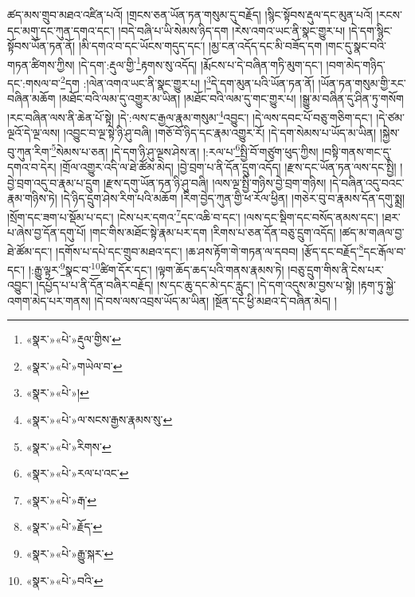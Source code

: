 ཚད་མས་གྲུབ་མཐའ་འཛིན་པའོ། །གྲངས་ཅན་ཡོན་ཏན་གསུམ་དུ་བརྗོད། །སྙིང་སྟོབས་རྡུལ་དང་མུན་པའོ། །རངས་དང་མགུ་དང་ཀུན་དགའ་དང་། །བདེ་བཞི་པ་ཡི་སེམས་ཉིད་དག །རེས་འགའ་ཡང་ནི་སྣང་གྱུར་པ། །དེ་དག་སྙིང་སྟོབས་ཡོན་ཏན་ནོ། །མི་དགའ་བ་དང་ཡོངས་གདུད་དང་། །མྱ་ངན་འདོད་དང་མི་བཟོད་དག །གང་དུ་སྣང་བའི་གཏན་ཚིགས་ཀྱིས། །དེ་དག་:རྡུལ་གྱི་\footnote{«སྣར་»«པེ་»རྡུལ་གྱིས་}རྟགས་སུ་འདོད། །རྨོངས་པ་དེ་བཞིན་གཏི་མུག་དང་། །བག་མེད་གཉིད་དང་:གསལ་བ་\footnote{«སྣར་»«པེ་»གཡེལ་བ་}དག :།ལེན་འགའ་ཡང་ནི་སྣང་གྱུར་པ། །\footnote{«སྣར་»«པེ་»།}དེ་དག་མུན་པའི་ཡོན་ཏན་ནོ། །ཡོན་ཏན་གསུམ་གྱི་རང་བཞིན་མཆོག །མཐོང་བའི་ལམ་དུ་འགྱུར་མ་ཡིན། །མཐོང་བའི་ལམ་དུ་གང་གྱུར་པ། །སྒྱུ་མ་བཞིན་དུ་ཤིན་ཏུ་གསོག །རང་བཞིན་ལས་ནི་ཆེན་པོ་སྟེ། །དེ་:ལས་ང་རྒྱལ་རྣམ་གསུམ་\footnote{«སྣར་»«པེ་»ལ་སངས་རྒྱས་རྣམས་སུ་}འབྱུང་། །དེ་ལས་དབང་པོ་བཅུ་གཅིག་དང་། །དེ་ཙམ་ལྔའོ་དེ་ལྔ་ལས། །འབྱུང་བ་ལྔ་སྟེ་ཉི་ཤུ་བཞི། །གཅོ་བོ་ཉིད་དང་རྣམ་འགྱུར་རོ། །དེ་དག་སེམས་པ་ཡོད་མ་ཡིན། །སྐྱེས་བུ་ཀུན་རིག་\footnote{«སྣར་»«པེ་»རིགས་}སེམས་པ་ཅན། །དེ་དག་ཉི་ཤུ་ལྔས་ཤེས་ན། །:རལ་པ་\footnote{«སྣར་»«པེ་»རལ་པ་འང་}སྤྱི་བོ་གཙུག་ཕུད་ཀྱིས། །བསྟི་གནས་གང་དུ་དགའ་བ་དེར། །གྲོལ་འགྱུར་འདི་ལ་ཐེ་ཚོམ་མེད། །བྱེ་བྲག་པ་ནི་དོན་དྲུག་འདོད། །རྫས་དང་ཡོན་ཏན་ལས་དང་སྤྱི། །བྱེ་བྲག་འདུ་བ་རྣམ་པ་དྲུག །རྫས་དགུ་ཡོན་ཏན་ཉི་ཤུ་བཞི། །ལས་ལྔ་སྤྱི་གཉིས་བྱེ་བྲག་གཉིས། །དེ་བཞིན་འདུ་བའང་རྣམ་གཉིས་ཏེ། །དེ་ཉིད་དྲུག་ཤེས་རིག་པའི་མཆོག །རིག་བྱེད་ཀུན་གྱི་ཕ་རོལ་ཕྱིན། །གཅེར་བུ་བ་རྣམས་དོན་དགུ་སྨྲ། །སྲོག་དང་ཟག་པ་སྡོམ་པ་དང་། །ངེས་པར་དགའ་\footnote{«སྣར་»«པེ་»རྒ་}དང་འཆི་བ་དང་། །ལས་དང་སྡིག་དང་བསོད་ནམས་དང་། །ཐར་པ་ཞེས་བྱ་དོན་དགུ་པོ། །གང་གིས་མཐོང་སྟེ་རྣམ་པར་དག །རིགས་པ་ཅན་དོན་བཅུ་དྲུག་འདོད། །ཚད་མ་གཞལ་བྱ་ཐེ་ཚོམ་དང་། །དགོས་པ་དཔེ་དང་གྲུབ་མཐའ་དང་། །ཆ་ཤས་རྟོག་གེ་གཏན་ལ་དབབ། །རྩོད་དང་བརྗོད་\footnote{«སྣར་»«པེ་»རྗོད་}དང་རྒོལ་བ་དང་། །:རྒྱུ་ལྟར་\footnote{«སྣར་»«པེ་»རྒྱུ་སྐར་}སྣང་བ་\footnote{«སྣར་»«པེ་»བའི་}ཚིག་དོར་དང་། །ལྟག་ཆོད་ཆད་པའི་གནས་རྣམས་ཏེ། །བཅུ་དྲུག་གིས་ནི་ངེས་པར་འབྱུང་། །དཔྱོད་པ་པ་ནི་དོན་བཞིར་བརྗོད། །ས་དང་ཆུ་དང་མེ་དང་རླུང་། །དེ་དག་འདུས་མ་བྱས་པ་སྟེ། །རྟག་ཏུ་སྐྱེ་འགག་མེད་པར་གནས། །དེ་བས་ལས་འབྲས་ཡོད་མ་ཡིན། །སྔོན་དང་ཕྱི་མཐའ་དེ་བཞིན་མེད། །
